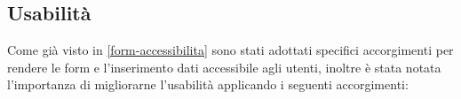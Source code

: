 \subsection{Usabilità}
\label{form-usabilita}
Come già visto in \ref{form-accessibilita} sono stati adottati specifici accorgimenti per rendere le form e l'inserimento dati accessibile agli utenti, inoltre è stata notata l'importanza di migliorarne l'usabilità applicando i seguenti accorgimenti: %
